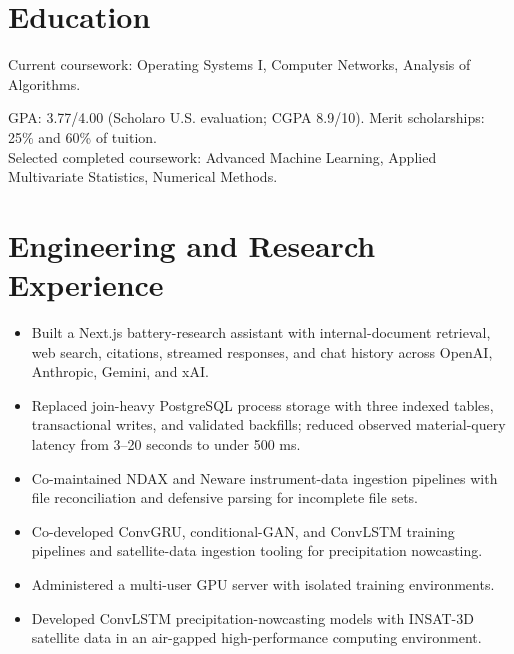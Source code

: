 
\titlespacing{\section}{0pt}{8pt}{3pt}

\resumeheader
\section{Education}
Current coursework: Operating Systems I, Computer Networks, Analysis of Algorithms.\par
\vspace{3pt}
GPA: 3.77/4.00 (Scholaro U.S. evaluation; CGPA 8.9/10). Merit scholarships: 25\% and 60\% of tuition.\\
Selected completed coursework: Advanced Machine Learning, Applied Multivariate Statistics, Numerical Methods.
\section{Engineering and Research Experience}
\begin{itemize}
  \item Built a Next.js battery-research assistant with internal-document retrieval, web search, citations, streamed responses, and chat history across OpenAI, Anthropic, Gemini, and xAI.
  \item Replaced join-heavy PostgreSQL process storage with three indexed tables, transactional writes, and validated backfills; reduced observed material-query latency from 3--20 seconds to under 500 ms.
  \item Co-maintained NDAX and Neware instrument-data ingestion pipelines with file reconciliation and defensive parsing for incomplete file sets.
\end{itemize}
\begin{itemize}
  \item Co-developed ConvGRU, conditional-GAN, and ConvLSTM training pipelines and satellite-data ingestion tooling for precipitation nowcasting.
  \item Administered a multi-user GPU server with isolated training environments.
\end{itemize}
\begin{itemize}
  \item Developed ConvLSTM precipitation-nowcasting models with INSAT-3D satellite data in an air-gapped high-performance computing environment.
\end{itemize}

